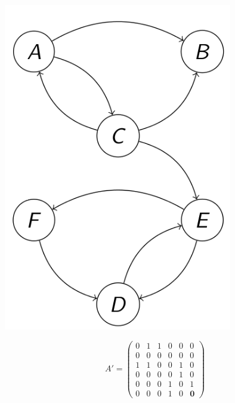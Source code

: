 \documentclass[a4paper]{scrartcl}
\def \blattnr {4}
\begin{document}
\begin{enumerate}[label=\bfseries \blattnr.\arabic*]
\begin{minipage}{0.24\textwidth}
     \includegraphics[width=0.75\textwidth]{assets/graph-nachher.png}
    \end{minipage}
    \begin{minipage}{0.5\textwidth}
     \begin{equation*}
	A' = \begin{pmatrix}
	     0 & 1 & 1 & 0 & 0 & 0 \\
	     0 & 0 & 0 & 0 & 0 & 0 \\
	     1 & 1 & 0 & 0 & 1 & 0 \\
	     0 & 0 & 0 & 0 & 1 & 0 \\
	     0 & 0 & 0 & 1 & 0 & 1 \\
	     0 & 0 & 0 & 1 & 0 & \textbf{0}
	    \end{pmatrix}
     \end{equation*}
    \end{minipage}
    

\end{enumerate}
\end{document}
